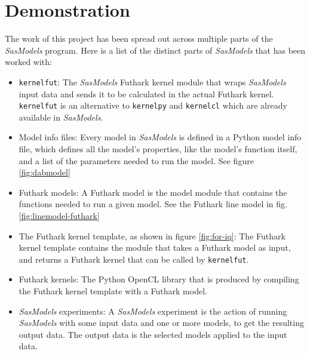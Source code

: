 \documentclass[11pt]{article}
\newcommand{\sasmodels}{\textit{SasModels}}
\begin{document}
\section{Demonstration}
\begin{mdframed}[
  frametitle={Terminology:},
  nobreak=true
  ]
  The work of this project has been spread out across multiple parts
  of the \sasmodels{} program. Here is a list of the distinct parts of 
  \sasmodels{} that has been worked with:
  \begin{itemize}
    \item \texttt{kernelfut}: The \sasmodels{} Futhark kernel module that wraps 
    \sasmodels{} input data and sends it to be calculated in the actual Futhark 
    kernel. \texttt{kernelfut} is an alternative to \texttt{kernelpy} and
    \texttt{kernelcl} which are already available in \sasmodels.

    \item Model info files: Every model in \sasmodels{} is defined in a Python 
    model info file, which defines all the model's properties, like the model's
    function itself, and a list of the parameters needed to run the model.
    See figure \ref{fig:dabmodel}

    \item Futhark models: A Futhark model is the model module that contains the
    functions needed to run a given model. See the Futhark line model in fig. 
    \ref{fig:linemodel-futhark}
    
    \item The Futhark kernel template, as shown in figure \ref{fig:for-iq}:
    The Futhark kernel template contains the module that takes a Futhark
    model as input, and returns a Futhark kernel that can be called by 
    \texttt{kernelfut}.
    
    \item Futhark kernels: The Python OpenCL library that is produced by 
    compiling the Futhark kernel template with a Futhark model.

    \item \sasmodels{} experiments: A \sasmodels{} experiment is the action of 
    running \sasmodels{} with some input data and one or more models, to get 
    the resulting output data. The output data is the selected models applied
    to the input data.
  \end{itemize}
  
\end{mdframed}
\end{document}
